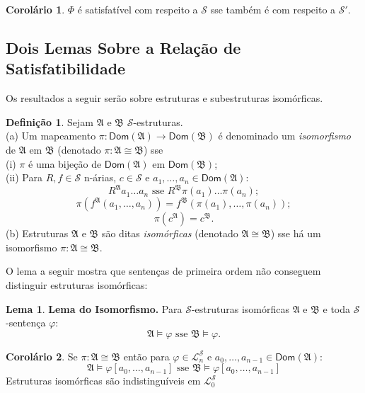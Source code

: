 \documentclass[11pt]{article}
\theoremstyle{definition}
\newtheorem{defn}{Definição}
\newtheorem{corollary}{Corolário}
\newtheorem{lemma}{Lema}
\newcommand{\mc}[1]{\mathcal{#1}}
\newcommand{\mf}[1]{\mathfrak{#1}}
\newcommand{\msf}[1]{\mathsf{#1}}
\begin{document}
\begin{corollary}
$\Phi$ é satisfatível com respeito a $\mc{S}$ sse também é com respeito a $\mc{S}'$.
\end{corollary}

\subsection{Dois Lemas Sobre a Relação de Satisfatibilidade}

Os resultados a seguir serão sobre estruturas e subestruturas isomórficas.

\begin{shaded}
\begin{defn}
Sejam $\mf{A}$ e $\mf{B}$ $\mc{S}$-estruturas.\\
(a) Um mapeamento $\pi:\msf{Dom}(\mf{A})\to\msf{Dom}(\mf{B})$ é denominado um \textit{isomorfismo} de $\mf{A}$ em $\mf{B}$ (denotado $\pi:\mf{A}\cong\mf{B}$) sse\\
(i) $\pi$ é uma bijeção de $\msf{Dom}(\mf{A})$ em $\msf{Dom}(\mf{B})$;\\
(ii) Para $R,f\in\mc{S}$ n-árias, $c\in\mc{S}$ e $a_1,\dots,a_n\in\msf{Dom}(\mf{A})$:
\[
R^\mf{A}a_1\dots a_n\text{ sse }R^\mf{B}\pi(a_1)\dots\pi(a_n);
\]
\[
\pi(f^\mf{A}(a_1,\dots,a_n))=f^\mf{B}(\pi(a_1),\dots,\pi(a_n));
\]
\[
\pi(c^\mf{A})=c^\mf{B}.
\]
(b) Estruturas $\mf{A}$ e $\mf{B}$ são ditas \textit{isomórficas} (denotado $\mf{A}\cong\mf{B}$) sse há um isomorfismo $\pi:\mf{A}\cong\mf{B}$. 
\end{defn}
\end{shaded}

O lema a seguir mostra que sentenças de primeira ordem não conseguem distinguir estruturas isomórficas:

\begin{lemma}
\textbf{Lema do Isomorfismo.} Para $\mc{S}$-estruturas isomórficas $\mf{A}$ e $\mf{B}$ e toda $\mc{S}$-sentença $\varphi$:
\[
\mf{A}\vDash\varphi\text{ sse }\mf{B}\vDash\varphi.
\]
\end{lemma}

\begin{corollary}
Se $\pi:\mf{A}\cong\mf{B}$ então para $\varphi\in\mc{L}^\mc{S}_n$ e $a_0,\dots,a_{n-1}\in\msf{Dom}(\mf{A})$:
\[
\mf{A}\vDash\varphi[a_0,\dots,a_{n-1}]\text{ sse }\mf{B}\vDash\varphi[a_0,\dots,a_{n-1}]
\]
Estruturas isomórficas são indistinguíveis em $\mc{L}^\mc{S}_0$
\end{corollary}
\end{document}

